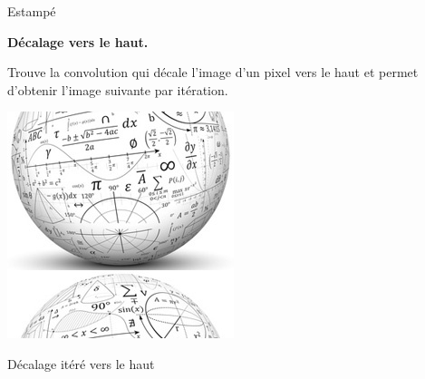 \documentclass[11pt,class=report,crop=false]{standalone}
\begin{document}
\begin{activite}
\begin{center}
\begin{minipage}{0.45\textwidth}
		Estampé
	\end{minipage}	
\end{center}



\bigskip

\textbf{Décalage vers le haut.}

Trouve la convolution qui décale l'image d'un pixel vers le haut et permet d'obtenir l'image suivante par itération.
\begin{center}
		\includegraphics[scale=\myscale,scale=0.52]{png/monde_conv_decal}
		
		Décalage itéré vers le haut
\end{center}
		
\end{activite}

\end{document}
